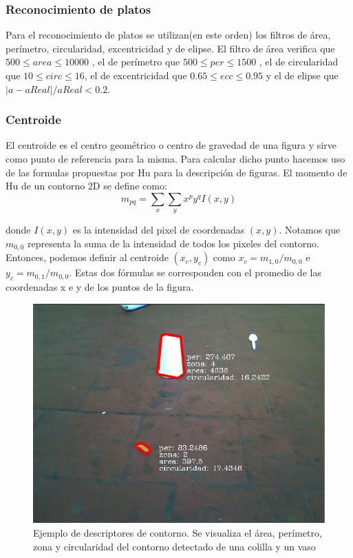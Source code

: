 	\subsubsection{Reconocimiento de platos}
	Para el reconocimiento de platos se utilizan(en este orden) los filtros de \'area, per\'imetro, circularidad, excentricidad y de elipse.
	El filtro de \'area verifica que $500 \leq area \leq 10000 $ , el de per\'imetro que $500 \leq per \leq 1500 $ , el de circularidad
	que $10 \leq circ \leq 16$, el de excentricidad que $0.65 \leq ecc \leq 0.95$ y el de elipse que $|a-aReal|/ aReal < 0.2$.
	
	\subsubsection{Centroide}
	El centroide es el centro geom\'etrico o centro de 
	gravedad de una figura y 
	sirve como punto de referencia para la misma. Para calcular dicho 
	punto hacemos uso de las formulas propuestas por Hu \cite{Hu1962} para la 
	descripci\'on de figuras. El momento de Hu de un contorno 2D se define como:
	\begin{equation}
		m_{pq}=\sum_{x}{\sum_{y}{x^py^qI(x,y)}}
	\end{equation}
	
	donde $I(x,y)$ es la intensidad del pixel de coordenadas $(x,y)$.
	Notamos que $m_{0,0}$ representa la suma de la intensidad de todos los pixeles del 
	contorno. Entonces, podemos definir al centroide $(x_c,y_c)$ como 
	$x_c= m_{1,0} / m_{0,0}$ e 
	$y_c=m_{0,1} / m_{0,0}$. Estas dos f\'ormulas se corresponden con el 
	promedio de las coordenadas x e y de los puntos de la figura.  


\begin{figure}[tpb]
\begin{center}
  \includegraphics[scale=0.4]{vision/figures/filtros.png}
\end{center}
  \caption[Ejemplo de descriptores de contorno]{\small Ejemplo de descriptores de contorno. Se visualiza el \'area, per\'imetro, zona y circularidad del contorno 
  detectado de una colilla y un vaso}
  \label{fig:desc}
\end{figure}


